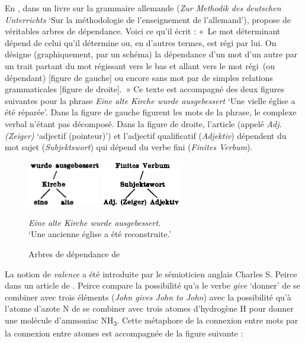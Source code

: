 {    En \citeyear{kern1883zur}, dans un livre sur la grammaire allemande (\textit{Zur Methodik des deutschen Unterrichts} ‘Sur la méthodologie de l’enseignement de l’allemand’),  propose de véritables arbres de dépendance. Voici ce qu’il écrit : «~Le mot déterminant dépend de celui qu’il détermine ou, en d’autres termes, est régi par lui. On désigne (graphiquement, par un schéma) la dépendance d’un mot d’un autre par un trait partant du mot régissant vers le bas et allant vers le mot régi~(ou dépendant) [figure de gauche] ou encore sans mot par de simples relations grammaticales [figure de droite].~» Ce texte est accompagné des deux figures suivantes pour la phrase \textit{Eine alte Kirche wurde ausgebessert} ‘Une vielle église a été réparée’. Dans la figure de gauche figurent les mots de la phrase, le complexe verbal n’étant pas décomposé. Dans la figure de droite, l’article (appelé \textit{Adj. (Zeiger)} ‘adjectif (pointeur)’) et l’adjectif qualificatif (\textit{Adjektiv}) dépendent du mot sujet (\textit{Subjektswort}) qui dépend du verbe fini (\textit{Finites Verbum}).

    \begin{figure}[H]
      \caption{Arbres de dépendance de \citet[10]{kern1883zur}}
    \includegraphics[height=2cm]{figures/Kern1883-1.png}
    \includegraphics[height=2cm]{figures/Kern1883-2.png}\smallskip\\    
    \noindent\parbox{6cm}{\small\textit{Eine alte Kirche wurde ausgebessert.}\\
    ‘Une ancienne église a été reconstruite.’}
    \end{figure}

    La notion de \textit{valence} a été introduite par le sémioticien anglais Charles S. Peirce dans un article de \citeyear{peirce1897logic}. Peirce compare la possibilité qu’a le verbe \textit{give} ‘donner’ de se combiner avec trois éléments (\textit{John gives John to John}) avec la possibilité qu’à l’atome d’azote N de se combiner avec trois atomes d’hydrogène H pour donner une molécule d’ammoniac NH\textsubscript{3}. Cette métaphore de la connexion entre mots par la connexion entre atomes est accompagnée de la figure suivante :

}
